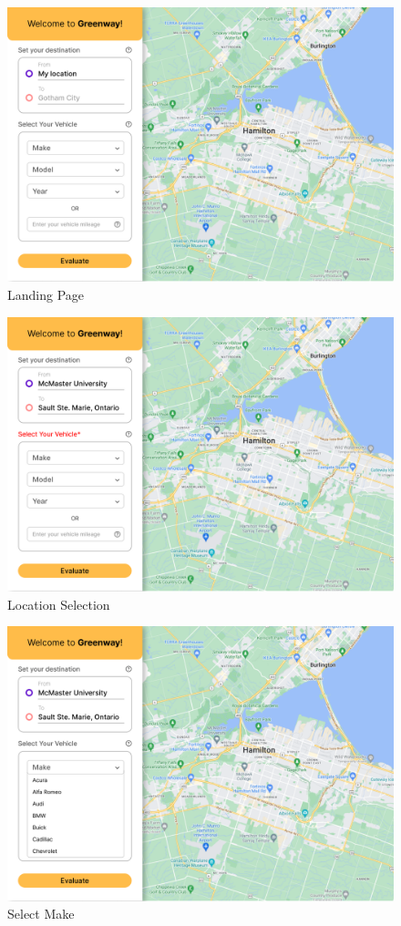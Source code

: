 \documentclass[12pt, titlepage]{article}
\begin{document}
\begin{figure}[h!]
    \centering
    \includegraphics[scale=0.23]{Desktop-1.png}
    \caption{Landing Page}
\end{figure}
\begin{figure}[h!]
    \centering
    \includegraphics[scale=0.23]{Desktop-2.png}
    \caption{Location Selection}
\end{figure}
\begin{figure}[h!]
    \centering
    \includegraphics[scale=0.26]{Desktop-3.png}
    \caption{Select Make}
\end{figure}
\end{document}
